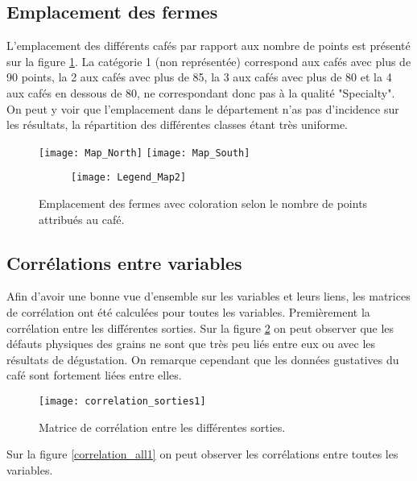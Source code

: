 \subsection{Emplacement des fermes}\label{EmpFermes} L'emplacement des différents cafés par rapport aux nombre de points est présenté sur la figure \ref{FincaVSPoints}. La catégorie 1 (non représentée) correspond aux cafés avec plus de 90 points, la 2 aux cafés avec plus de 85, la 3 aux cafés avec plus de 80 et la 4 aux cafés en dessous de 80, ne correspondant donc pas à la qualité "Specialty". On peut y voir que l'emplacement dans le département n'as pas d'incidence sur les résultats, la répartition des différentes classes étant très uniforme. 


\begin{figure}[H]
	\texttt{[image: Map\_North]}
	\newline
	\newline
	\newline
	\texttt{[image: Map\_South]}
	
	\begin{figure}[H]
		\texttt{[image: Legend\_Map2]}
	\end{figure}
	\caption{\label{FincaVSPoints} Emplacement des fermes avec coloration selon le nombre de points attribués au café.}
\end{figure}


\subsection{Corrélations entre variables}

Afin d'avoir une bonne vue d'ensemble sur les variables et leurs liens, les matrices de corrélation ont été calculées pour toutes les variables. Premièrement la corrélation entre les différentes sorties. Sur la figure \ref{correlation_sorties1} on peut observer que les défauts physiques des grains ne sont que très peu liés entre eux ou avec les résultats de dégustation. On remarque cependant que les données gustatives du café sont fortement liées entre elles. 

\begin{figure}[H]
	\texttt{[image: correlation\_sorties1]}
	\caption{\label{correlation_sorties1} Matrice de corrélation entre les différentes sorties.}
\end{figure}


\noindent Sur la figure \ref{correlation_all1} on peut observer les corrélations entre toutes les variables. 


